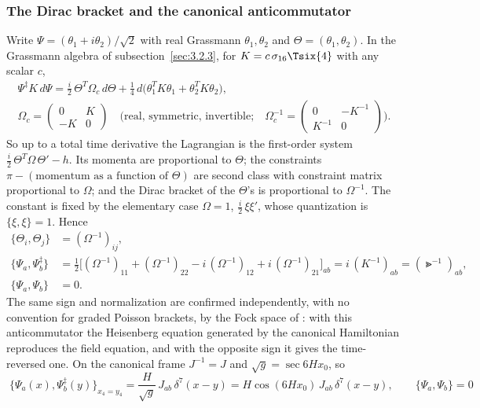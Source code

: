 \subsubsection{The Dirac bracket and the canonical anticommutator}
\label{sec:3.5.3}

Write $\Psi=(\theta_1+i\theta_2)/\sqrt2$ with real Grassmann $\theta_1,\theta_2$ and
$\Theta=(\theta_1,\theta_2)$. In the Grassmann algebra of subsection~\ref{sec:3.2.3}, for
$K=c\,\sigma_{16}\Tsix{4}$ with any scalar $c$,
\begin{gather*}
  \Psi^{\ddagger}K\,d\Psi=\frac{i}{2}\,\Theta^{T}\Omega_c\,d\Theta+\frac14\,d\bigl(\theta_1^{T}K\theta_1+\theta_2^{T}K\theta_2\bigr),\\
  \Omega_c=\begin{pmatrix}0&K\\-K&0\end{pmatrix}\quad\text{(real, symmetric, invertible;}\quad
  \Omega_c^{-1}=\begin{pmatrix}0&-K^{-1}\\K^{-1}&0\end{pmatrix}\text{)} .
\end{gather*}
So up to a total time derivative the Lagrangian is the first-order system
$\frac{i}{2}\,\Theta^{T}\Omega\,\Theta'-h$. Its momenta are proportional to $\Theta$; the constraints
$\pi-(\text{momentum as a function of }\Theta)$ are second class with constraint matrix proportional
to $\Omega$; and the Dirac bracket of the $\Theta$'s is proportional to $\Omega^{-1}$. The constant is
fixed by the elementary case $\Omega=1$, $\frac{i}{2}\,\xi\xi'$, whose quantization is $\{\xi,\xi\}=1$.
Hence
\begin{align*}
  \{\Theta_i,\Theta_j\}&=(\Omega^{-1})_{ij},\\
  \{\Psi_a,\Psi^{\ddagger}_b\}&=\tfrac12\bigl[(\Omega^{-1})_{11}+(\Omega^{-1})_{22}-i\,(\Omega^{-1})_{12}+i\,(\Omega^{-1})_{21}\bigr]_{ab}
    =i\,(K^{-1})_{ab}=(\Gt^{-1})_{ab},\\
  \{\Psi_a,\Psi_b\}&=0 .
\end{align*}
The same sign and normalization are confirmed independently, with no convention for graded Poisson
brackets, by the Fock space of : with this anticommutator the Heisenberg equation
generated by the canonical Hamiltonian reproduces the field equation, and with the opposite sign it
gives the time-reversed one. On the canonical frame $J^{-1}=J$ and $\sqrt g=\sec 6Hx_0$, so
\[
  \boxed{\;\{\Psi_a(x),\Psi^{\ddagger}_b(y)\}_{x_4=y_4}=\frac{H}{\sqrt g}\,J_{ab}\,\delta^7(x-y)=H\cos(6Hx_0)\,J_{ab}\,\delta^7(x-y),
  \qquad\{\Psi_a,\Psi_b\}=0\;}
\]
